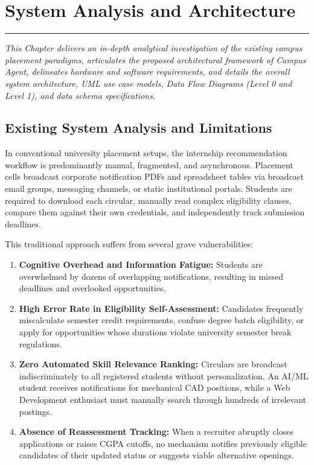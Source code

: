 \chapter{System Analysis and Architecture}
\label{C3} %
\graphicspath{{images/}{Figures/}}
\noindent\rule{\linewidth}{2pt}
\textit{This Chapter delivers an in-depth analytical investigation of the existing campus placement paradigms, articulates the proposed architectural framework of Campus Agent, delineates hardware and software requirements, and details the overall system architecture, UML use case models, Data Flow Diagrams (Level 0 and Level 1), and data schema specifications.}
\section{Existing System Analysis and Limitations} \label{S3.1}
In conventional university placement setups, the internship recommendation workflow is predominantly manual, fragmented, and asynchronous. Placement cells broadcast corporate notification PDFs and spreadsheet tables via broadcast email groups, messaging channels, or static institutional portals. Students are required to download each circular, manually read complex eligibility clauses, compare them against their own credentials, and independently track submission deadlines.

This traditional approach suffers from several grave vulnerabilities:
\begin{enumerate}[label=\textbf{\arabic*.}]
	\item \textbf{Cognitive Overhead and Information Fatigue:} Students are overwhelmed by dozens of overlapping notifications, resulting in missed deadlines and overlooked opportunities.
	\item \textbf{High Error Rate in Eligibility Self-Assessment:} Candidates frequently miscalculate semester credit requirements, confuse degree batch eligibility, or apply for opportunities whose durations violate university semester break regulations.
	\item \textbf{Zero Automated Skill Relevance Ranking:} Circulars are broadcast indiscriminately to all registered students without personalization. An AI/ML student receives notifications for mechanical CAD positions, while a Web Development enthusiast must manually search through hundreds of irrelevant postings.
	\item \textbf{Absence of Reassessment Tracking:} When a recruiter abruptly closes applications or raises CGPA cutoffs, no mechanism notifies previously eligible candidates of their updated status or suggests viable alternative openings.
\end{enumerate}

